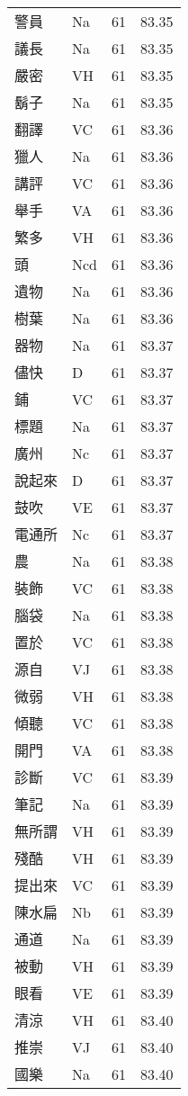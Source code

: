 \documentclass[twocolumn]{book}
\begin{document}
\begin{supertabular}{llrr}
警員 & Na & 61 &  83.35\\
議長 & Na & 61 &  83.35\\
嚴密 & VH & 61 &  83.35\\
鬍子 & Na & 61 &  83.35\\
翻譯 & VC & 61 &  83.36\\
獵人 & Na & 61 &  83.36\\
講評 & VC & 61 &  83.36\\
舉手 & VA & 61 &  83.36\\
繁多 & VH & 61 &  83.36\\
頭 & Ncd & 61 &  83.36\\
遺物 & Na & 61 &  83.36\\
樹葉 & Na & 61 &  83.36\\
器物 & Na & 61 &  83.37\\
儘快 & D & 61 &  83.37\\
鋪 & VC & 61 &  83.37\\
標題 & Na & 61 &  83.37\\
廣州 & Nc & 61 &  83.37\\
說起來 & D & 61 &  83.37\\
鼓吹 & VE & 61 &  83.37\\
電通所 & Nc & 61 &  83.37\\
農 & Na & 61 &  83.38\\
裝飾 & VC & 61 &  83.38\\
腦袋 & Na & 61 &  83.38\\
置於 & VC & 61 &  83.38\\
源自 & VJ & 61 &  83.38\\
微弱 & VH & 61 &  83.38\\
傾聽 & VC & 61 &  83.38\\
開門 & VA & 61 &  83.38\\
診斷 & VC & 61 &  83.39\\
筆記 & Na & 61 &  83.39\\
無所謂 & VH & 61 &  83.39\\
殘酷 & VH & 61 &  83.39\\
提出來 & VC & 61 &  83.39\\
陳水扁 & Nb & 61 &  83.39\\
通道 & Na & 61 &  83.39\\
被動 & VH & 61 &  83.39\\
眼看 & VE & 61 &  83.39\\
清涼 & VH & 61 &  83.40\\
推崇 & VJ & 61 &  83.40\\
國樂 & Na & 61 &  83.40\\

\end{supertabular}
\end{document}
